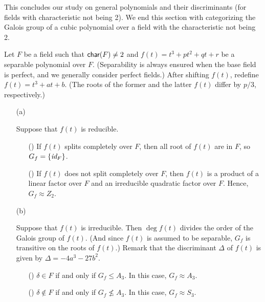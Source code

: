 This concludes our study on general polynomials and their discriminants (for fields with characteristic not being 2).
We end this section with categorizing the Galois group of a cubic polynomial over a field with the characteristic not being 2.
\begin{obs}
    Let $F$ be a field such that ${\textsf{char}({F})}\neq 2$ and $f(t)=t^3+pt^2+qt+r$ be a separable polynomial over $F$. (Separability is always ensured when the base field is perfect, and we generally consider perfect fields.)
    After shifting $f(t)$, redefine $f(t)=t^3+at+b$.
    (The roots of the former and the latter $f(t)$ differ by $p/3$, respectively.)
    \begin{enumerate}
        \item[(a)]
        {
            Suppose that $f(t)$ is reducible.
            \begin{enumerate}
                \item[(\romannumeral 1)]
                {
                    If $f(t)$ splits completely over $F$, then all root of $f(t)$ are in $F$, so $G_f=\{\textit{id}_{F}\}$.
                }
                \item[(\romannumeral 2)]
                {
                    If $f(t)$ does not split completely over $F$, then $f(t)$ is a product of a linear factor over $F$ and an irreducible quadratic factor over $F$.
                    Hence, $G_f\approx Z_2$.
                }
            \end{enumerate}
        }
        \item[(b)]
        {
            Suppose that $f(t)$ is irreducible.
            Then $\deg f(t)$ divides the order of the Galois group of $f(t)$. (And since $f(t)$ is assumed to be separable, $G_f$ is transitive on the roots of $f(t)$.)
            Remark that the discriminant $\Delta$ of $f(t)$ is given by $\Delta=-4a^3-27b^2$.
            \begin{enumerate}
                \item[(\romannumeral 3)]
                {
                    $\delta\in F$ if and only if $G_f\leq A_3$.
                    In this case, $G_f\approx A_3$.
                }
                \item[(\romannumeral 4)]
                {
                    $\delta\notin F$ if and only if $G_f\not\leq A_3$.
                    In this case, $G_f\approx S_3$.
                }
            \end{enumerate}
        }
    \end{enumerate}
\end{obs}

